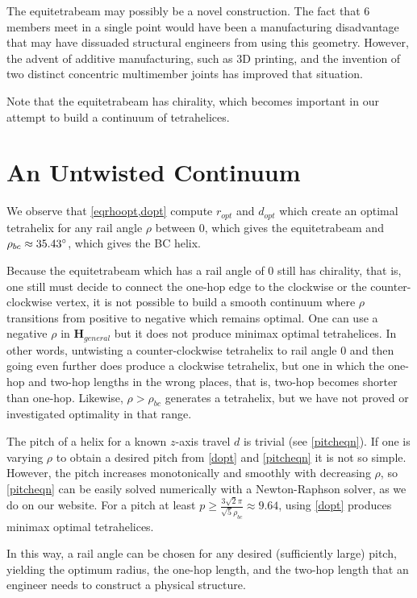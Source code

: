 \documentclass[twocolumn,10pt]{asme2ej}
\renewcommand{\vec}[1]{\mathbf{#1}}
\begin{document}
The equitetrabeam may possibly be a novel construction.
The fact that 6 members meet in a single point would have been a manufacturing disadvantage that
may have dissuaded structural engineers from using this geometry.
However, the advent of additive manufacturing, such as 3D printing, and the invention of two
distinct concentric multimember joints\cite{song2003spherical,HamlinSandersonCMS} has improved that situation.

Note that the equitetrabeam has chirality, which becomes important in our attempt to build a
continuum of tetrahelices.

\section{An Untwisted Continuum}
\label{sec:continuum}


We observe that  \cref{eqrhoopt,dopt} compute $r_{opt}$ and $d_{opt}$ which
create an optimal tetrahelix for any rail angle $\rho$ between $0$, which
gives the equitetrabeam and
$\rho_{bc} \approx 35.43 \degree$, which gives the BC helix.

 Because the equitetrabeam which has a rail angle of $0$ still has
 chirality, that is, one still must decide to connect the one-hop edge to
 the clockwise or the counter-clockwise vertex, it is not possible to build
 a smooth continuum where $\rho$ transitions from positive to negative
 which remains optimal. One can use a negative $\rho$ in $\vec{H}_{general}$
 but it does not produce minimax optimal tetrahelices. In other words,
 untwisting a counter-clockwise tetrahelix to rail angle $0$ and then going
even further does produce a clockwise tetrahelix, but one in which the
 one-hop and two-hop lengths in the wrong places, that is, two-hop
 becomes shorter than one-hop.
 Likewise, $\rho > \rho_{bc}$ generates
 a tetrahelix, but we have not proved or investigated optimality in that range.
 
 The pitch of a helix for a known $z$-axis travel $d$
 is trivial (see \cref{pitcheqn}).
If one is varying $\rho$ to obtain a desired pitch
from \cref{dopt} and \cref{pitcheqn} it is not so simple.
However, the pitch increases monotonically and smoothly with decreasing $\rho$, so
\cref{pitcheqn} can be easily solved numerically with a Newton-Raphson
solver, as we do on our website.
For a pitch at least $ p \geq \frac{3  \sqrt{2}  \pi}{\sqrt{5}\rho_{bc}} \approx 9.64 $,
using \cref{dopt} produces minimax optimal tetrahelices.

In this way, a rail angle can be chosen for any desired (sufficiently large) pitch, yielding
the optimum radius, the one-hop length, and the two-hop length that an engineer needs to
construct a physical structure.
\end{document}
